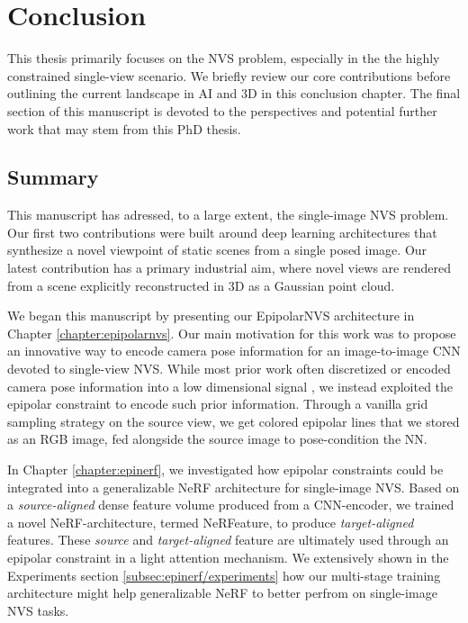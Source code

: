 \chapter{Conclusion}
\label{chapter:conclusion}

{}


This thesis primarily focuses on the \ac{NVS} problem, especially in the the highly constrained single-view scenario. We briefly review our core contributions before outlining the current landscape in \ac{AI} and 3D in this conclusion chapter. The final section of this manuscript is devoted to the perspectives and potential further work that may stem from this PhD thesis.  

\section{Summary}

This manuscript has adressed, to a large extent, the single-image \ac{NVS} problem. Our first two contributions were built around deep learning architectures that synthesize a novel viewpoint of static scenes from a single posed image. Our latest contribution has a primary industrial aim, where novel views are rendered from a scene explicitly reconstructed in 3D as a Gaussian point cloud.

We began this manuscript by presenting our EpipolarNVS architecture in Chapter \ref{chapter:epipolarnvs}. Our main motivation for this work was to propose an innovative way to encode camera pose information for an image-to-image \ac{CNN} devoted to single-view \ac{NVS}. While most prior work often discretized \citep{kim2020novel} or encoded camera pose information into a low dimensional signal \citep{sun2018multiview}, we instead exploited the epipolar constraint to encode such prior information. Through a vanilla grid sampling strategy on the source view, we get colored epipolar lines that we stored as an RGB image, fed alongside the source image to pose-condition the \ac{NN}. 

In Chapter \ref{chapter:epinerf}, we investigated how epipolar constraints could be integrated into a generalizable \ac{NeRF} architecture for single-image \ac{NVS}. Based on a \textit{source-aligned} dense feature volume produced from a \ac{CNN}-encoder, we trained a novel \ac{NeRF}-architecture, termed NeRFeature, to produce \textit{target-aligned} features. These \textit{source} and \textit{target-aligned} feature are ultimately used through an epipolar constraint in a light attention mechanism. We extensively shown in the Experiments section \ref{subsec:epinerf/experiments} how our multi-stage training architecture might help generalizable \ac{NeRF} to better perfrom on single-image \ac{NVS} tasks.  

